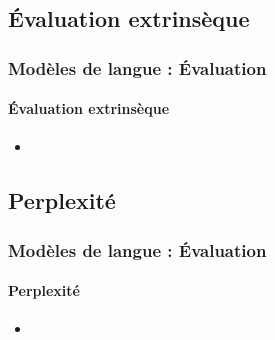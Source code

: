 \documentclass[xcolor=table]{beamer}
\begin{document}
\subsection{Évaluation extrinsèque}

\begin{frame}
\frametitle{Modèles de langue : Évaluation}
\framesubtitle{Évaluation extrinsèque}

\begin{itemize}
	\item 
\end{itemize}

\end{frame}

\subsection{Perplexité}

\begin{frame}
\frametitle{Modèles de langue : Évaluation}
\framesubtitle{Perplexité}

\begin{itemize}
	\item 
\end{itemize}

\end{frame}

\end{document}
